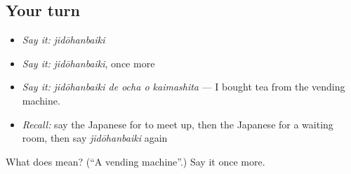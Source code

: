 \subsection*{Your turn}
\begin{itemize}
\raggedright
  \item \emph{Say it:} \emph{jidōhanbaiki}
  \item \emph{Say it:} \emph{jidōhanbaiki}, once more
  \item \emph{Say it:} \emph{jidōhanbaiki de ocha o kaimashita} — I bought tea from the vending machine.
  \item \emph{Recall:} say the Japanese for to meet up, then the Japanese for a waiting room, then say \emph{jidōhanbaiki} again
\end{itemize}

\begin{tcolorbox}[breakable,colback=teal!4,colframe=teal!35!black,title={Before you move on}]
What does  mean? (\textquotedblleft{}A vending machine\textquotedblright{}.) Say it once more.
\end{tcolorbox}
